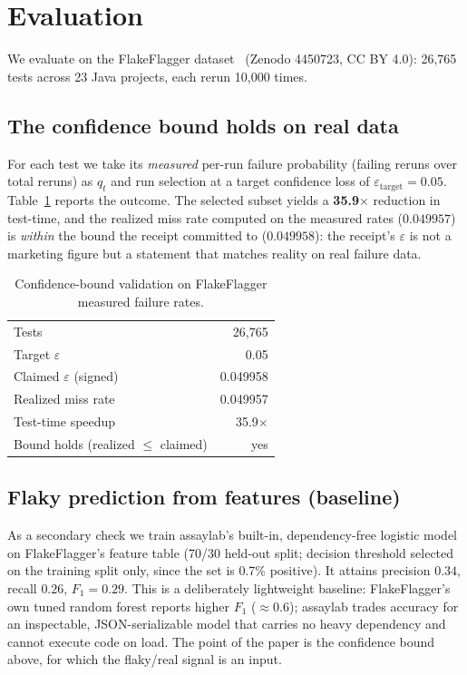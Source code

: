 \documentclass[11pt]{article}
\newcommand{\eps}{\varepsilon}
\begin{document}
\section{Evaluation}
\label{sec:eval}

We evaluate on the FlakeFlagger dataset~\cite{flakeflagger} (Zenodo 4450723, CC
BY 4.0): 26{,}765 tests across 23 Java projects, each rerun 10{,}000 times.

\subsection{The confidence bound holds on real data}

For each test we take its \emph{measured} per-run failure probability
(failing reruns over total reruns) as $q_t$ and run selection at a target
confidence loss of $\eps_{\text{target}} = 0.05$. Table~\ref{tab:bound} reports
the outcome. The selected subset yields a \textbf{35.9$\times$} reduction in
test-time, and the realized miss rate computed on the measured rates
($0.049957$) is \emph{within} the bound the receipt committed to ($0.049958$):
the receipt's $\eps$ is not a marketing figure but a statement that matches
reality on real failure data.

\begin{table}[h]
\centering
\begin{tabular}{lr}
\toprule
Tests & 26{,}765 \\
Target $\eps$ & 0.05 \\
Claimed $\eps$ (signed) & 0.049958 \\
Realized miss rate & 0.049957 \\
Test-time speedup & 35.9$\times$ \\
Bound holds (realized $\le$ claimed) & yes \\
\bottomrule
\end{tabular}
\caption{Confidence-bound validation on FlakeFlagger measured failure rates.}
\label{tab:bound}
\end{table}

\subsection{Flaky prediction from features (baseline)}

As a secondary check we train assaylab's built-in, dependency-free logistic
model on FlakeFlagger's feature table (70/30 held-out split; decision threshold
selected on the training split only, since the set is 0.7\% positive). It
attains precision $0.34$, recall $0.26$, $F_1 = 0.29$. This is a deliberately
lightweight baseline: FlakeFlagger's own tuned random forest reports higher
$F_1$ (${\approx}0.6$); assaylab trades accuracy for an inspectable,
JSON-serializable model that carries no heavy dependency and cannot execute code
on load. The point of the paper is the confidence bound above, for which the
flaky/real signal is an input.
\end{document}
